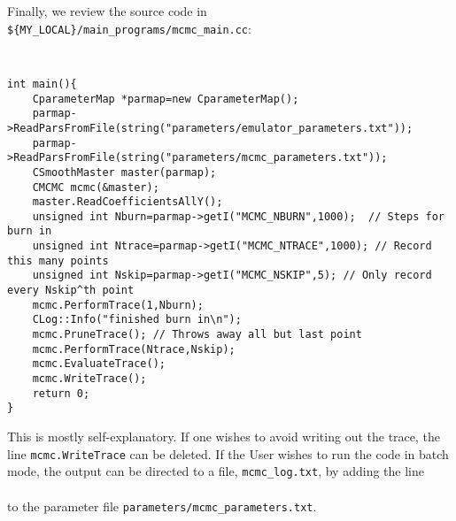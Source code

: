 \documentclass[UserManual.tex]{subfiles}
\begin{document}
Finally, we review the source code in {\tt \$\{MY\_LOCAL\}/main\_programs/mcmc\_main.cc}:
{\tt
\begin{verbatim}
int main(){
	CparameterMap *parmap=new CparameterMap();
	parmap->ReadParsFromFile(string("parameters/emulator_parameters.txt"));
	parmap->ReadParsFromFile(string("parameters/mcmc_parameters.txt"));
	CSmoothMaster master(parmap);	
	CMCMC mcmc(&master);
	master.ReadCoefficientsAllY();
	unsigned int Nburn=parmap->getI("MCMC_NBURN",1000);  // Steps for burn in
	unsigned int Ntrace=parmap->getI("MCMC_NTRACE",1000); // Record this many points
	unsigned int Nskip=parmap->getI("MCMC_NSKIP",5); // Only record every Nskip^th point	
	mcmc.PerformTrace(1,Nburn);	
	CLog::Info("finished burn in\n");
	mcmc.PruneTrace(); // Throws away all but last point
	mcmc.PerformTrace(Ntrace,Nskip);
	mcmc.EvaluateTrace();
	mcmc.WriteTrace();
	return 0;
}
\end{verbatim}}
This is mostly self-explanatory. If one wishes to avoid writing out the trace, the line {\tt mcmc.WriteTrace} can be deleted. If the User wishes to run the code in batch mode, the output can be directed to a file, {\tt mcmc\_log.txt}, by adding the line\\
\hspace*{20pt}{\tt SmoothEmulator\_LogFileName mcmc\_log.txt} \\
to the parameter file {\tt parameters/mcmc\_parameters.txt}.






 
\end{document}
